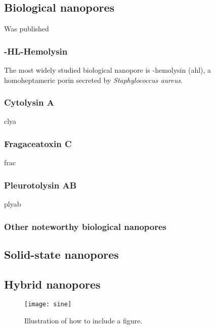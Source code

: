 \subsection{Biological nanopores}



Was published \cite{Willems-VanMeervelt-2017}

\subsubsection{\textalpha-HL\textalpha-Hemolysin}

The most widely studied biological nanopore is \textalpha-hemolysin (\gls{ahl}), a homoheptameric porin
secreted by \textit{Staphylococcus aureus}.



\subsubsection{Cytolysin A}

\gls{clya}

\subsubsection{Fragaceatoxin C}

\gls{frac}

\subsubsection{Pleurotolysin AB}

\gls{plyab}

\subsubsection{Other noteworthy biological nanopores}

\subsection{Solid-state nanopores}

\subsection{Hybrid nanopores}




\begin{figure}
  \centering
  \medskip
  \texttt{[image: sine]}
  \caption{Illustration of how to include a figure. }
  \label{fig:sine}
\end{figure}




\cleardoublepage

